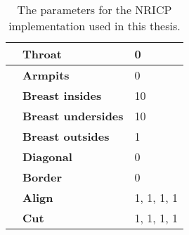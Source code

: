 \begin{table}[]
\begin{tabular}{|l|l|l|}
\textbf{}                                                           & \textbf{Throat}                  & 0                               \\ \hline
\textbf{}                                                           & \textbf{Armpits}                 & 0                               \\ \hline
\textbf{}                                                           & \textbf{Breast insides}          & 10                              \\ \hline
\textbf{}                                                           & \textbf{Breast undersides}       & 10                              \\ \hline
\textbf{}                                                           & \textbf{Breast outsides}         & 1                               \\ \hline
\textbf{}                                                           & \textbf{Diagonal}                & 0                               \\ \hline
\textbf{}                                                           & \textbf{Border}                  & 0                               \\ \hline
\textbf{}                                                           & \textbf{Align}                   & 1, 1, 1, 1                      \\ \hline
\textbf{}                                                           & \textbf{Cut}                     & 1, 1, 1, 1                      \\ \hline
\end{tabular}
\caption[NRICP parameters]{The parameters for the NRICP implementation used in this thesis.}
\label{nricpParams}
\end{table}

